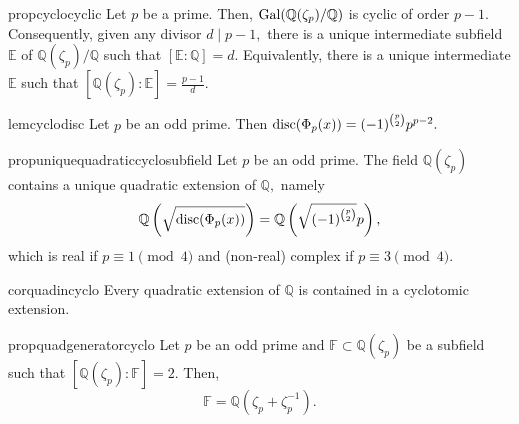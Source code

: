 \begin{restatable}[]{prop}{cyclocyclic}
\label{prop:cyclocyclic}
    Let $p$ be a prime. Then, $\operatorname{Gal}(\mathbb{Q}(\zeta_p)/\mathbb{Q})$ is cyclic of order $p - 1.$ Consequently, given any divisor $d \mid p - 1,$ there is a unique intermediate subfield $\mathbb{E}$ of $\mathbb{Q}(\zeta_p)/\mathbb{Q}$ such that $[\mathbb{E} : \mathbb{Q}] = d.$ Equivalently, there is a unique intermediate $\mathbb{E}$ such that $[\mathbb{Q}(\zeta_p) : \mathbb{E}] = \frac{p - 1}{d}.$ \hfill\hyperref[prop:cyclocyclic2]{\downsym}
\end{restatable}

\begin{restatable}[]{lem}{cyclodisc}
\label{lem:cyclodisc}
    Let $p$ be an odd prime. Then $\operatorname{disc}(\Phi_p(x)) = (-1)^{\binom{p}{2}}p^{p - 2}.$ \hfill\hyperref[lem:cyclodisc2]{\downsym}
\end{restatable}

\begin{restatable}[]{prop}{uniquequadraticcyclosubfield}
\label{prop:uniquequadraticcyclosubfield}
    Let $p$ be an odd prime. The field $\mathbb{Q}(\zeta_p)$ contains a unique quadratic extension of $\mathbb{Q},$ namely
    \begin{equation*} 
        \mathbb{Q}\left(\sqrt{\operatorname{disc}(\Phi_p(x))}\right) = \mathbb{Q}\left(\sqrt{(-1)^{\binom{p}{2}}}p\right),
    \end{equation*}
    which is real if $p \equiv 1 \pmod{4}$ and (non-real) complex if $p \equiv 3 \pmod{4}.$ \hfill\hyperref[prop:uniquequadraticcyclosubfield2]{\downsym}
\end{restatable}

\begin{restatable}[]{cor}{quadincyclo}
\label{cor:quadincyclo}
    Every quadratic extension of $\mathbb{Q}$ is contained in a cyclotomic extension. \hfill\hyperref[cor:quadincyclo2]{\downsym}
\end{restatable}

\begin{restatable}[]{prop}{quadgeneratorcyclo}
\label{prop:quadgeneratorcyclo}
    Let $p$ be an odd prime and $\mathbb{F} \subset \mathbb{Q}(\zeta_p)$ be a subfield such that $[\mathbb{Q}(\zeta_p) : \mathbb{F}] = 2.$ Then,
    \begin{equation*} 
        \mathbb{F} = \mathbb{Q}(\zeta_p + \zeta_p^{-1}).
    \end{equation*} \hfill\hyperref[prop:quadgeneratorcyclo2]{\downsym}
\end{restatable}

